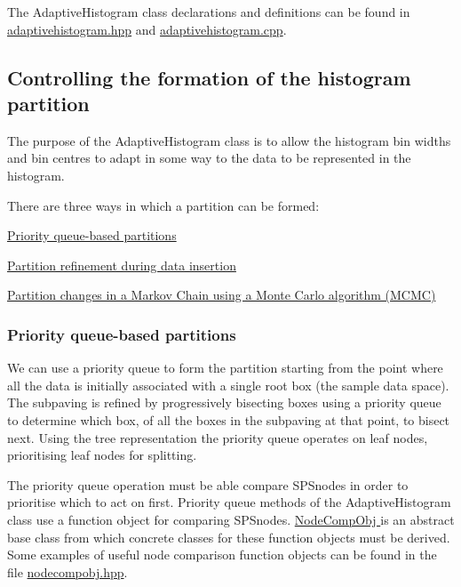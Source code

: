 \-The \-Adaptive\-Histogram class declarations and definitions can be found in \hyperlink{adaptivehistogram_8hpp}{adaptivehistogram.\-hpp} and \hyperlink{adaptivehistogram_8cpp}{adaptivehistogram.\-cpp}.



\hypertarget{AdaptiveHistograms_adhsec_tree}{}\subsection{\-Controlling the formation of the histogram partition}\label{AdaptiveHistograms_adhsec_tree}
\-The purpose of the \-Adaptive\-Histogram class is to allow the histogram bin widths and bin centres to adapt in some way to the data to be represented in the histogram.

\-There are three ways in which a partition can be formed\-:


\begin{DoxyItemize}
\item \hyperlink{AdaptiveHistograms_adhsubsec_pq}{\-Priority queue-\/based partitions}
\item \hyperlink{AdaptiveHistograms_adhsubsec_onebyone}{\-Partition refinement during data insertion}
\item \hyperlink{AdaptiveHistograms_adhsubsec_mcmc}{\-Partition changes in a \-Markov \-Chain using a \-Monte \-Carlo algorithm (\-M\-C\-M\-C)}
\end{DoxyItemize}\hypertarget{AdaptiveHistograms_adhsubsec_pq}{}\subsubsection{\-Priority queue-\/based partitions}\label{AdaptiveHistograms_adhsubsec_pq}
\-We can use a priority queue to form the partition starting from the point where all the data is initially associated with a single root box (the sample data space). \-The subpaving is refined by progressively bisecting boxes using a priority queue to determine which box, of all the boxes in the subpaving at that point, to bisect next. \-Using the tree representation the priority queue operates on leaf nodes, prioritising leaf nodes for splitting.

\-The priority queue operation must be able compare \-S\-P\-Snodes in order to prioritise which to act on first. \-Priority queue methods of the \-Adaptive\-Histogram class use a function object for comparing \-S\-P\-Snodes. \hyperlink{classsubpavings_1_1NodeCompObj}{\-Node\-Comp\-Obj } is an abstract base class from which concrete classes for these function objects must be derived. \-Some examples of useful node comparison function objects can be found in the file \hyperlink{nodecompobj_8hpp}{nodecompobj.\-hpp}.

